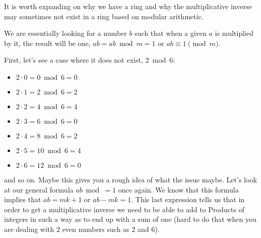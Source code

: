 It is worth expanding on why we have a ring and why the multiplicative inverse may sometimes not exist
in a ring based on modular arithmetic.

We are essentially looking for a number $b$ such that when a given $a$ is multiplied by it, the result will be one,
$ab = ab \bmod m = 1$ or $ab \equiv 1 \pmod m$.

First, let's see a case where it does not exist, $2 \bmod 6$:
\begin{itemize}
    \item $2\cdot 0 = 0 \bmod 6 = 0$
    \item $2\cdot 1 = 2 \bmod 6 = 2$
    \item $2\cdot 2 = 4 \bmod 6 = 4$
    \item $2\cdot 3 = 6 \bmod 6 = 0$
    \item $2\cdot 4 = 8 \bmod 6 = 2$
    \item $2\cdot 5 = 10\bmod 6 = 4$
    \item $2\cdot 6 = 12\bmod 6 = 0$
\end{itemize}
and so on.
Maybe this gives you a rough idea of what the issue maybe.
Let's look at our general formula $ab \bmod = 1$ once again.
We know that this formula implies that $ab = mk + 1$ or $ab - mk = 1$.
This last expression tells us that in order to get a multiplicative inverse we need to be able to add to Products
of integers in such a way as to end up with a sum of one (hard to do that when you are dealing with 2 even numbers such as 2 and 6).
